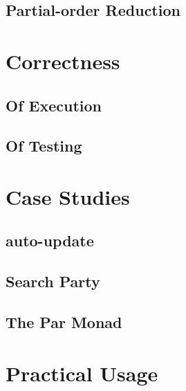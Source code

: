 \documentclass[openright, dottedtoc, headinclude, footinclude=true, a4paper, numbers=noenddot, fontsize=10pt]{scrreprt}
\begin{document}
  \subsection{Partial-order Reduction}
  \label{sec:sct-por}
  

\section{Correctness}
\label{chap:correctness}


  \subsection{Of Execution}
  \label{sec:correctness-execution}
  

  \subsection{Of Testing}
  \label{sec:correctness-testing}
  

\section{Case Studies}
\label{chap:casestudies}


  \subsection{auto-update}
  \label{sec:casestudies-autoupdate}
  

  \subsection{Search Party}
  \label{sec:casestudies-searchparty}
  

  \subsection{The Par Monad}
  \label{sec:casestudies-parmonad}
  

\section{Practical Usage}
\label{chap:practice}

\end{document}
